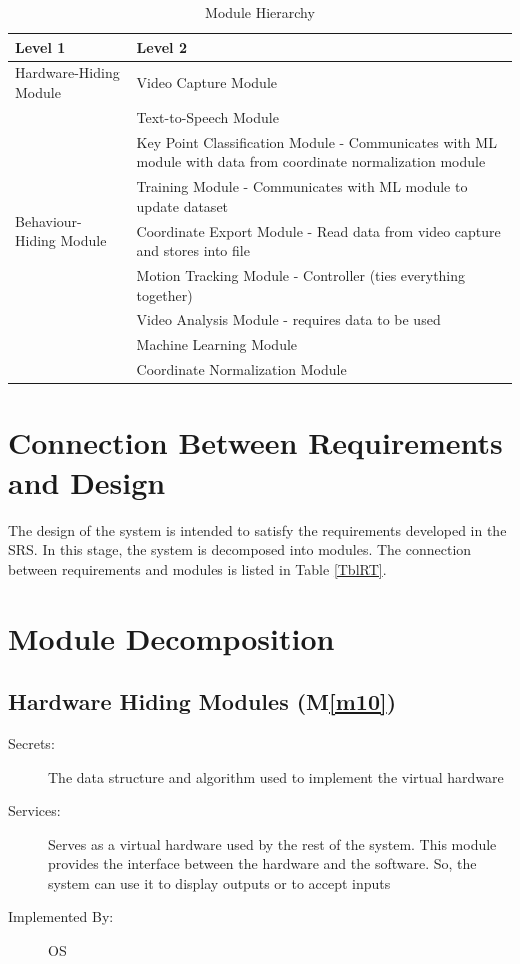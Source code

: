\documentclass[12pt, titlepage]{article}
\newcommand{\mref}[1]{M\ref{#1}}
\begin{document}
\begin{table}[h!]
\centering
\begin{tabular}{p{} p{}}
\toprule
\textbf{Level 1} & \textbf{Level 2}\\
\midrule
{Hardware-Hiding Module} & Video Capture Module \\
\midrule
\multirow{7}{0.3\textwidth}{Behaviour-Hiding Module} & Text-to-Speech Module\\
& Key Point Classification Module - Communicates with ML module with data from coordinate normalization module\\
& Training Module - Communicates with ML module to update dataset\\
& Coordinate Export Module - Read data from video capture and stores into file\\
& Motion Tracking Module - Controller (ties everything together)\\
\midrule
\multirow{3}{0.3\textwidth}{Software Decision Module} & Video Analysis Module - requires data to be used\\
& Machine Learning Module\\
& Coordinate Normalization Module\\
\bottomrule
\end{tabular}
\caption{Module Hierarchy}
\label{TblMH}
\end{table}

\newpage

\section{Connection Between Requirements and Design} \label{SecConnection}

The design of the system is intended to satisfy the requirements developed in
the SRS. In this stage, the system is decomposed into modules. The connection
between requirements and modules is listed in Table \ref{TblRT}.

\section{Module Decomposition} \label{SecMD}

\subsection{Hardware Hiding Modules (\mref{m10})}

\begin{description}
  \item[Secrets:] The data structure and algorithm used to implement the virtual hardware
  \item[Services:] Serves as a virtual hardware used by the rest of the system. This module provides the interface between the hardware and the software. So, the system can use it to display outputs or to accept inputs
  \item[Implemented By:] OS
  \end{description}
  
\end{document}
